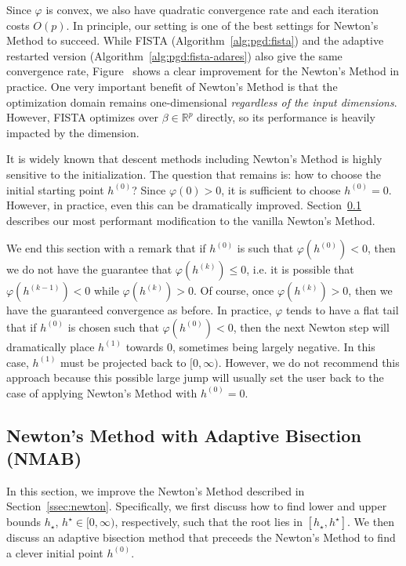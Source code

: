 \documentclass[fontsize=11pt]{article}
\newcommand{\R}{\mathbb{R}}
\newcommand{\todojames}[1]{\todo[linecolor=blue, backgroundcolor=blue!25, bordercolor=blue]{James: #1}}
\begin{document}
Since $\varphi$ is convex, we also have quadratic convergence rate and each iteration costs $O(p)$.
In principle, our setting is one of the best settings for Newton's Method to succeed.
While FISTA (Algorithm~\ref{alg:pgd:fista}) and the adaptive restarted version
(Algorithm~\ref{alg:pgd:fista-adares}) also give the same convergence rate,
Figure~\todojames{add figure ref} 
shows a clear improvement for the Newton's Method in practice.
One very important benefit of Newton's Method is that the optimization domain
remains one-dimensional \emph{regardless of the input dimensions}.
However, FISTA optimizes over $\beta \in \R^p$ directly, so its performance is heavily
impacted by the dimension.

It is widely known that descent methods including Newton's Method
is highly sensitive to the initialization.
The question that remains is: how to choose the initial starting point $h^{(0)}$?
Since $\varphi(0) > 0$, it is sufficient to choose $h^{(0)} = 0$.
However, in practice, even this can be dramatically improved.
Section~\ref{ssec:nmab} describes our most performant 
modification to the vanilla Newton's Method.

We end this section with a remark that if $h^{(0)}$ is such that $\varphi(h^{(0)}) < 0$,
then we do not have the guarantee that $\varphi(h^{(k)}) \leq 0$,
i.e. it is possible that $\varphi(h^{(k-1)}) < 0$ while $\varphi(h^{(k)}) > 0$.
Of course, once $\varphi(h^{(k)}) > 0$, then we have the guaranteed convergence as before.
In practice, $\varphi$ tends to have a flat tail that if $h^{(0)}$ is chosen such that
$\varphi(h^{(0)}) < 0$, then the next Newton step will dramatically place $h^{(1)}$ towards 0,
sometimes being largely negative.
In this case, $h^{(1)}$ must be projected back to $[0, \infty)$.
However, we do not recommend this approach because this possible large jump
will usually set the user back to the case of applying Newton's Method with $h^{(0)} = 0$.

\subsection{Newton's Method with Adaptive Bisection (NMAB)}\label{ssec:nmab}

In this section, we improve the Newton's Method described in Section~\ref{ssec:newton}.
Specifically, we first discuss how to find lower and upper bounds $h_\star$, $h^\star \in [0,\infty)$,
respectively, such that the root lies in $[h_\star, h^\star]$.
We then discuss an adaptive bisection method that preceeds the Newton's Method
to find a clever initial point $h^{(0)}$.
\end{document}
